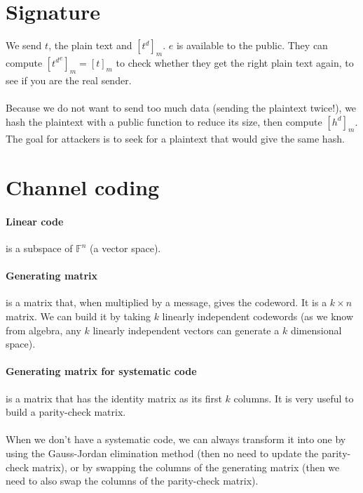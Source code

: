 \documentclass{article}
\begin{document}
\newpage

\section{Signature}

We send $t$, the plain text and $[t^d]_m$. $e$ is available to the public. They can compute $[{t^d}^e]_m = [t]_m$ to check whether they get the right plain text again, to see if you are the real sender.\\\\
Because we do not want to send too much data (sending the plaintext twice!), we hash the plaintext with a public function to reduce its size, then compute $[h^d]_m$. The goal for attackers is to seek for a plaintext that would give the same hash.

\newpage

\section{Channel coding}

\paragraph{Linear code} is a subspace of \( \mathbb{F}^n \) (a vector space).

\paragraph{Generating matrix} is a matrix that, when multiplied by a message, gives the codeword. It is a \( k \times n \) matrix. We can build it by taking \( k \) linearly independent codewords (as we know from algebra, any \( k \) linearly independent vectors can generate a \( k \) dimensional space).

\paragraph{Generating matrix for systematic code} is a matrix that has the identity matrix as its first \( k \) columns. It is very useful to build a parity-check matrix.\\\\
When we don't have a systematic code, we can always transform it into one by using the Gauss-Jordan elimination method (then no need to update the parity-check matrix), or by swapping the columns of the generating matrix (then we need to also swap the columns of the parity-check matrix).
\end{document}
